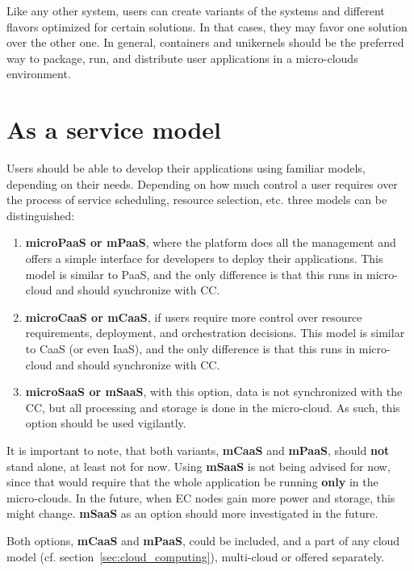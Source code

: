 Like any other system, users can create variants of the systems and different flavors optimized for certain solutions. In that cases, they may favor one solution over the other one. In general, containers and unikernels should be the preferred way to package, run, and distribute user applications in a micro-clouds environment.
%
%
\section{As a service model}\label{sec:as_a_service_model}
%
Users should be able to develop their applications using familiar models, depending on their needs. Depending on how much control a user requires over the process of service scheduling, resource selection, etc. three models can be distinguished:
 
\begin{enumerate}[start=1,label={(\bfseries \arabic*)}]
	\item \textbf{microPaaS or mPaaS}, where the platform does all the management and offers a simple interface for developers to deploy their applications. This model is similar to PaaS, and the only difference is that this runs in micro-cloud and should synchronize with CC.
	\item \textbf{microCaaS or mCaaS}, if users require more control over resource requirements, deployment, and orchestration decisions. This model is similar to CaaS (or even IaaS), and the only difference is that this runs in micro-cloud and should synchronize with CC.
	\item \textbf{microSaaS or mSaaS}, with this option, data is not synchronized with the CC, but all processing and storage is done in the micro-cloud. As such, this option should be used vigilantly.
\end{enumerate}

\noindent
It is important to note, that both variants, \textbf{mCaaS} and \textbf{mPaaS}, should \textbf{not} stand alone, at least not for now. Using \textbf{mSaaS} is not being advised for now, since that would require that the whole application be running \textbf{only} in the micro-clouds. In the future, when EC nodes gain more power and storage, this might change. \textbf{mSaaS} as an option should more investigated in the future.

Both options, \textbf{mCaaS} and \textbf{mPaaS}, could be included, and a part of any cloud model (cf. section~\ref{sec:cloud_computing}), multi-cloud or offered separately.
%
%
